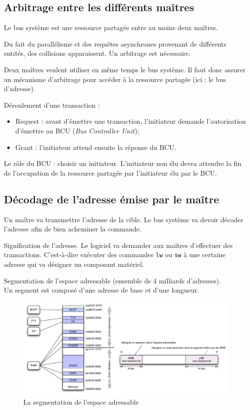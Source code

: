 \documentclass[11pt,english,french]{scrreprt}
\theoremstyle{remark}
\theoremstyle{definition}
\begin{document}
\subsection*{Arbitrage entre les différents maîtres} %
Le bus système est une ressource partagée entre au moins deux maîtres.

Du fait du parallélisme et des requêtes asynchrones provenant de différents entités, des collisions apparaissent. Un arbitrage est nécessaire.

Deux maîtres veulent utiliser en même temps le bus système. Il faut donc assurer un mécanisme d'arbitrage pour accéder à la ressource partagée (ici : le bus d'adresse).

Déroulement d'une transaction :\begin{itemize}
	\item Request : avant d'émettre une transaction, l'initiateur demande l'autorisation d'émettre au BCU (\emph{Bus Controller Unit});
	\item Grant : l'initiateur attend ensuite la réponse du BCU.
\end{itemize}

Le rôle du BCU : choisir un initiateur. L'initiateur non élu devra attendre la fin de l'occupation de la ressource partagée par l'initiateur élu par le BCU.

\subsection*{Décodage de l'adresse émise par le maître} %
Un maître va transmettre l'adresse de la cible. Le bus système va devoir décoder l'adresse afin de bien acheminer la commande.

Signification de l'adresse.
Le logiciel va demander aux maîtres d'effectuer des transactions. C'est-à-dire exécuter des commandes \lstinline!lw! ou \lstinline!sw! à une certaine adresse qui va désigner un composant matériel.

Segmentation de l'espace adressable (ensemble de 4 milliards d'adresses).\\
Un segment est composé d'une adresse de base et d'une longueur.

\begin{figure}[!h]
	\center
	\includegraphics[scale=.6]{diagrammes/adresse}
	\caption{La segmentation de l'espace adressable}
\end{figure}
\end{document}
